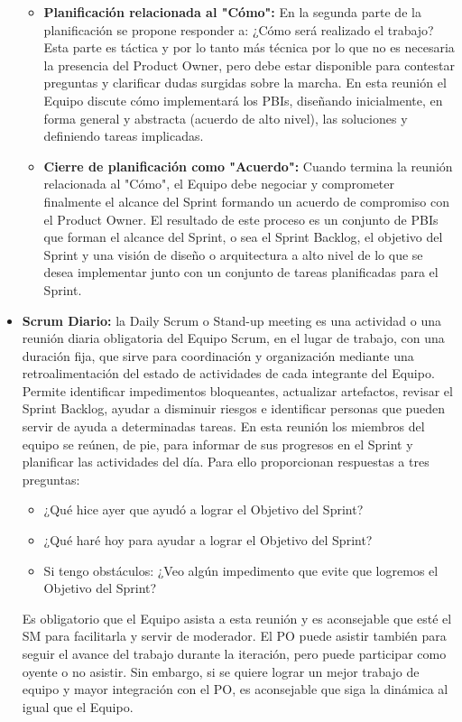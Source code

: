 \begin{itemize}
\begin{itemize}
\item \textbf{Planificación relacionada al "Cómo":} En la segunda parte de la planificación se propone responder a: ¿Cómo será realizado el trabajo? Esta parte es táctica y por lo tanto más técnica por lo que no es necesaria la presencia del Product Owner, pero debe estar disponible para contestar preguntas y clarificar dudas surgidas sobre la marcha. En esta reunión el Equipo discute cómo implementará los PBIs, diseñando inicialmente, en forma general y abstracta (acuerdo de alto nivel), las soluciones y definiendo tareas implicadas. 

\item \textbf{Cierre de planificación como "Acuerdo":} Cuando termina la reunión relacionada al "Cómo", el Equipo debe negociar y comprometer finalmente el alcance del Sprint formando un acuerdo de compromiso con el Product Owner. El resultado de este proceso es un conjunto de PBIs que forman el alcance del Sprint, o sea el Sprint Backlog, el objetivo del Sprint y una visión de diseño o arquitectura a alto nivel de lo que se desea implementar junto con un conjunto de tareas planificadas para el Sprint.

\end{itemize}

\item \textbf{Scrum Diario:} la Daily Scrum o Stand-up meeting es una actividad o una reunión diaria obligatoria del Equipo Scrum, en el lugar de trabajo, con una duración fija, que sirve para coordinación y organización mediante una retroalimentación del estado de actividades de cada integrante del Equipo. Permite identificar impedimentos bloqueantes, actualizar artefactos, revisar el Sprint Backlog, ayudar a disminuir riesgos e identificar personas que pueden servir de ayuda a determinadas tareas. En esta reunión los miembros del equipo se reúnen, de pie, para informar de sus progresos en el Sprint y planificar las actividades del día. Para ello proporcionan respuestas a tres preguntas:

\begin{itemize}
\item{¿Qué hice ayer que ayudó a lograr el Objetivo del Sprint?}
\item{¿Qué haré hoy para ayudar a lograr el Objetivo del Sprint?}
\item{Si tengo obstáculos: ¿Veo algún impedimento que evite que logremos el Objetivo del Sprint?}
\end{itemize}

Es obligatorio que el Equipo asista a esta reunión y es aconsejable que esté el SM para facilitarla y servir de moderador. El PO puede asistir también para seguir el avance del trabajo durante la iteración, pero puede participar como oyente o no asistir. Sin embargo, si se quiere lograr un mejor trabajo de equipo y mayor integración con el PO, es aconsejable que siga la dinámica al igual que el Equipo.


\end{itemize}
